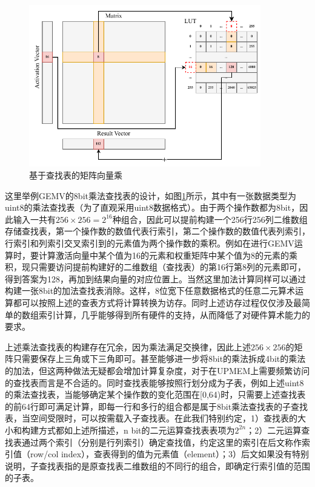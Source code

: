 \begin{figure}[!htbp]
	\centering
    \includegraphics[width=0.9\textwidth]{figures/LUT.pdf}
	\caption{基于查找表的矩阵向量乘}
    \label{LUT}
\end{figure}

这里举例GEMV的8bit乘法查找表的设计，如图\ref{LUT}所示，其中有一张数据类型为uint8的乘法查找表（为了直观采用uint8数据格式）。由于两个操作数都为8bit，因此输入一共有$256\times 256=2^{16}$种组合，因此可以提前构建一个256行256列二维数组存储查找表，第一个操作数的数值代表行索引，第二个操作数的数值代表列索引，行索引和列索引交叉索引到的元素值为两个操作数的乘积。例如在进行GEMV运算时，要计算激活向量中某个值为16的元素和权重矩阵中某个值为8的元素的乘积，现只需要访问提前构建好的二维数组（查找表）的第16行第8列的元素即可，得到答案为128，再加到结果向量的对应位置上。当然这里加法计算同样可以通过构建一张8bit的加法查找表消除。这样，8位宽下任意数据格式的任意二元算术运算都可以按照上述的查表方式将计算转换为访存。同时上述访存过程仅仅涉及最简单的数组索引计算，几乎能够得到所有硬件的支持，从而降低了对硬件算术能力的要求。

上述乘法查找表的构建存在冗余，因为乘法满足交换律，因此上述$256\times 256$的矩阵只需要保存上三角或下三角即可。甚至能够进一步将8bit的乘法拆成4bit的乘法的加法，但这两种做法无疑都会增加计算复杂度，对于在UPMEM上需要频繁访问的查找表而言是不合适的。同时查找表能够按照行划分成为子表，例如上述uint8的乘法查找表，当能够确定某个操作数的变化范围在[0,64)时，只需要上述查找表的前64行即可满足计算，即每一行和多行的组合都是属于8bit乘法查找表的子查找表，当空间受限时，可以按需载入子查找表。在此我们特别约定，1）查找表的大小和构建方式都如上述所描述，n bit的二元运算查找表表项为$2^{2n}$；2）二元运算查找表通过两个索引（分别是行列索引）确定查找值，约定这里的索引在后文称作索引值（row/col index），查表得到的值为元素值（element）；3）后文如果没有特别说明，子查找表指的是原查找表二维数组的不同行的组合，即确定行索引值的范围的子表。

